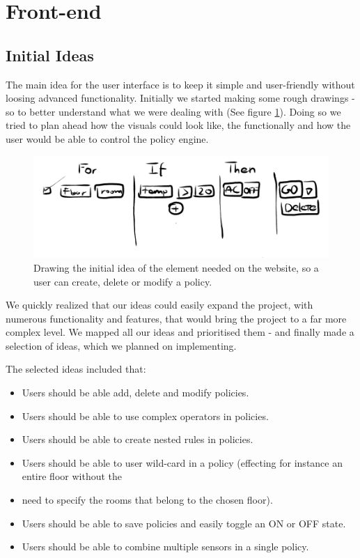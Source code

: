 \section{Front-end}
\label{sec:front-end}
\subsection{Initial Ideas}

The main idea for the user interface is to keep it simple and user-friendly without loosing advanced functionality. Initially we started making some rough drawings -so to better understand what we were dealing with (See figure \ref{fig:initial_idea_frontend}). Doing so we tried to plan ahead how the visuals could look like, the functionally and how the user would be able to control the policy engine.

\begin{figure}[h!]
\centering
\includegraphics[width=\columnwidth]{initial_idea_frontend.png}
\caption{Drawing the initial idea of the element needed on the website, so a user can create, delete or modify a policy.}
\label{fig:initial_idea_frontend}
\end{figure}

We quickly realized that our ideas could easily expand the project, with numerous functionality and features, that would bring the project to a far more complex level. We mapped all our ideas and prioritised them - and finally made a selection of ideas, which we planned on implementing.

The selected ideas included that:
\begin{itemize}
\item Users should be able add, delete and modify policies.
\item Users should be able to use complex operators in policies.
\item Users should be able to create nested rules in policies.
\item Users should be able to user wild-card in a policy (effecting for instance an entire floor without the \item need to specify the rooms that belong to the chosen floor).
\item Users should be able to save policies and easily toggle an ON or OFF state.
\item Users should be able to combine multiple sensors in a single policy.
\end{itemize}

